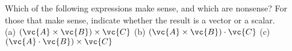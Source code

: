 Which of the following expressions make sense, and which
are nonsense? For those that make sense, indicate whether
the result is a vector or a scalar.\\
(a) $(\vc{A}\times\vc{B})\times\vc{C}$\hwendpart
(b) $(\vc{A}\times\vc{B})\cdot\vc{C}$\hwendpart
(c) $(\vc{A}\cdot\vc{B})\times\vc{C}$

